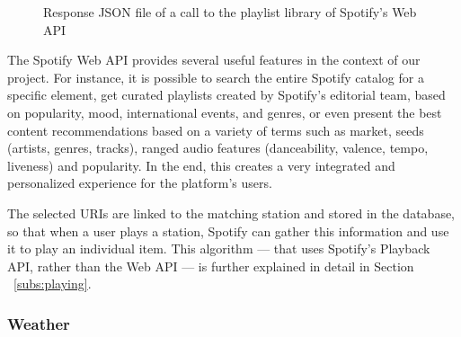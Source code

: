 \begin{figure}[h]
\centering
{}
\caption{Response JSON file of a call to the playlist library of Spotify's Web API}
\label{fig:mys}
\end{figure}


The Spotify Web \ac{API} provides several useful features in the context of our project. For instance, it is possible to search the entire Spotify catalog for a specific element, get curated playlists created by Spotify’s editorial team, based on popularity, mood, international events, and genres, or even present the best content recommendations based on a variety of terms such as market, seeds (artists, genres, tracks), ranged audio features (danceability, valence, tempo, liveness) and popularity. In the end, this creates a very integrated and personalized experience for the platform's users.

The selected \acp{URI} are linked to the matching station and stored in the database, so that when a user plays a station, Spotify can gather this information and use it to play an individual item. This algorithm — that uses Spotify's Playback \ac{API}, rather than the Web \ac{API} — is further explained in detail in Section ~\ref{subs:playing}.
\newpage

\subsubsection{Weather}

